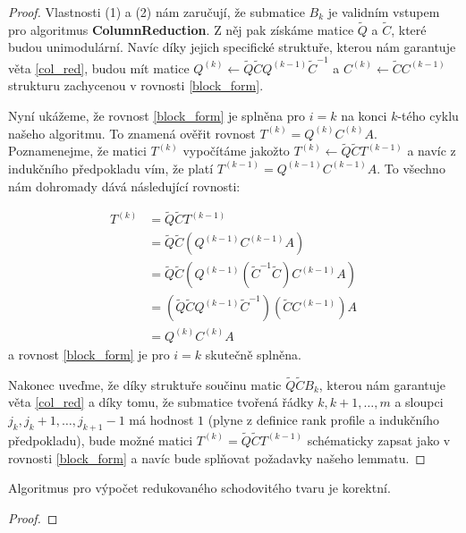 \begin{proof}
Vlastnosti (1) a (2) nám zaručují, že submatice $ B_k $ je validním vstupem pro
algoritmus \textbf{ColumnReduction}. Z něj pak získáme matice $ \tilde{Q} $ a
$ \tilde{C} $, které budou unimodulární. Navíc díky jejich specifické struktuře,
kterou nám garantuje věta \ref{col_red}, budou mít matice
$ { Q^{(k)} \leftarrow \tilde{Q} \tilde{C} Q^{(k - 1)} \tilde{C}^{-1} } $ a
$ { C^{(k)} \leftarrow \tilde{C} C^{(k - 1)} } $
strukturu zachycenou v rovnosti \ref{block_form}.

Nyní ukážeme, že rovnost \ref{block_form} je splněna pro $ i = k $
na konci $ k $-tého cyklu našeho algoritmu. To znamená ověřit rovnost
$ T^{(k)} = Q^{(k)} C^{(k)} A $. Poznamenejme, že matici $ T^{(k)} $ vypočítáme
jakožto $ T^{(k)} \leftarrow \tilde{Q} \tilde{C} T^{(k - 1)} $ a navíc
z indukčního předpokladu vím, že platí $ T^{(k - 1)} = Q^{(k - 1)} C^{(k - 1)} A $.
To všechno nám dohromady dává následující rovnosti:

\begin{align*}
    T^{(k)} &= \tilde{Q} \tilde{C} T^{(k - 1)} \\
            &= \tilde{Q} \tilde{C} (Q^{(k - 1)} C^{(k - 1)} A) \\
            &= \tilde{Q} \tilde{C} (Q^{(k - 1)} (\tilde{C}^{-1} \tilde{C}) C^{(k - 1)} A) \\
            &= (\tilde{Q} \tilde{C} Q^{(k - 1)} \tilde{C}^{-1}) (\tilde{C} C^{(k - 1)}) A \\
            &= Q^{(k)} C^{(k)} A
\end{align*}
a rovnost \ref{block_form} je pro $ i = k $ skutečně splněna.

Nakonec uveďme, že díky struktuře součinu matic $ \tilde{Q} \tilde{C} B_k $, kterou
nám garantuje věta \ref{col_red} a díky tomu, že submatice tvořená řádky
$ k, k+1, \dots, m $ a sloupci $ j_k, j_k + 1, \dots, j_{k+1} - 1 $ má hodnost
$ 1 $ (plyne z definice rank profile a indukčního předpokladu), bude možné matici
$ T^{(k)} = \tilde{Q} \tilde{C} T^{(k - 1)} $ schématicky zapsat jako v rovnosti
\ref{block_form} a navíc bude splňovat požadavky našeho lemmatu.
\end{proof}


\begin{vet} \label{RST_algo}
Algoritmus pro výpočet redukovaného schodovitého tvaru je korektní.
\end{vet}
\begin{proof}
\end{proof}


\cleardoublepage

